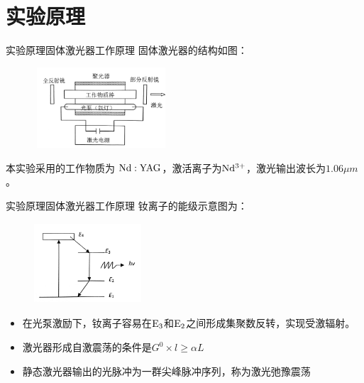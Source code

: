 \documentclass{beamer}
\begin{document}


\section{实验原理}

\begin{frame}{实验原理}{固体激光器工作原理}
固体激光器的结构如图：
\begin{figure}
  \includegraphics[height=3cm,width=5cm]{images/1.jpg}
  \label{fg1}
\end{figure}
本实验采用的工作物质为 \(\rm Nd:YAG\)，激活离子为\(\rm Nd^{3+}\)，激光输出波长为\(1.06\mu m\)。
\end{frame}
\begin{frame}{实验原理}{固体激光器工作原理}
  钕离子的能级示意图为：
  \begin{figure}
    \includegraphics[height=3cm,width=4cm]{images/2.jpg}
    \label{fg2}
  \end{figure}
  \begin{itemize}
    \item 在光泵激励下，钕离子容易在\(\rm E_3\)和\(\rm E_2\)之间形成集聚数反转，实现受激辐射。
    \item 激光器形成自激震荡的条件是\(G^0 \times l \geq \alpha L \)
    \item 静态激光器输出的光脉冲为一群尖峰脉冲序列，称为激光弛豫震荡
  \end{itemize}
  
\end{frame}
\end{document}
